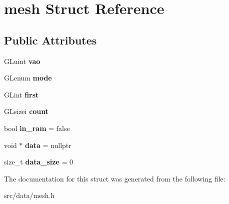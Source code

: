 \hypertarget{structmesh}{}\section{mesh Struct Reference}
\label{structmesh}
\subsection*{Public Attributes}
\begin{DoxyCompactItemize}
\item 
\hypertarget{structmesh_aac6a143cc21a75b2765d8a89dc1fa106}{}G\+Luint {\bfseries vao}\label{structmesh_aac6a143cc21a75b2765d8a89dc1fa106}

\item 
\hypertarget{structmesh_aff5bbe541c07e2c7f0efc3aff94c4770}{}G\+Lenum {\bfseries mode}\label{structmesh_aff5bbe541c07e2c7f0efc3aff94c4770}

\item 
\hypertarget{structmesh_ab779a22d6c3c6ec0f0e7e3b122088d18}{}G\+Lint {\bfseries first}\label{structmesh_ab779a22d6c3c6ec0f0e7e3b122088d18}

\item 
\hypertarget{structmesh_af32caf2b4679015fe9c46ef5a9b87b93}{}G\+Lsizei {\bfseries count}\label{structmesh_af32caf2b4679015fe9c46ef5a9b87b93}

\item 
\hypertarget{structmesh_a5bc0f130cf2302db0e2c3bc6ea291ca3}{}bool {\bfseries in\+\_\+ram} = false\label{structmesh_a5bc0f130cf2302db0e2c3bc6ea291ca3}

\item 
\hypertarget{structmesh_a1836b96265dc3c202d41f8617634831e}{}void $\ast$ {\bfseries data} = nullptr\label{structmesh_a1836b96265dc3c202d41f8617634831e}

\item 
\hypertarget{structmesh_a0a189add2f75c31674ca34c7dda1e177}{}size\+\_\+t {\bfseries data\+\_\+size} = 0\label{structmesh_a0a189add2f75c31674ca34c7dda1e177}

\end{DoxyCompactItemize}


The documentation for this struct was generated from the following file\+:\begin{DoxyCompactItemize}
\item 
src/data/mesh.\+h\end{DoxyCompactItemize}
